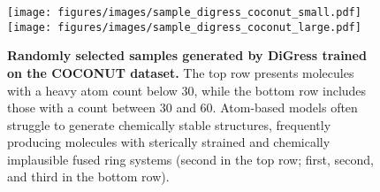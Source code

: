 \begin{figure}[h!]
    \centering
    \texttt{[image: figures/images/sample\_digress\_coconut\_small.pdf]}
    \texttt{[image: figures/images/sample\_digress\_coconut\_large.pdf]}
    \caption{\textbf{Randomly selected samples generated by DiGress trained on the COCONUT dataset.} The top row presents molecules with a heavy atom count below 30, while the bottom row includes those with a count between 30 and 60. Atom-based models often struggle to generate chemically stable structures, frequently producing molecules with sterically strained and chemically implausible fused ring systems (second in the top row; first, second, and third in the bottom row).}
    \label{fig:sample_digress_coconut}
\end{figure}
